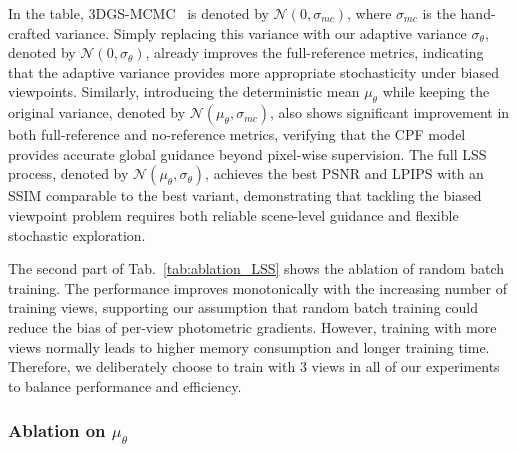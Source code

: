 \documentclass[lettersize,journal]{IEEEtran}
\begin{document}
In the table, 3DGS-MCMC~\cite{mcmc} is denoted by $\mathcal{N}(0, \sigma_{mc})$, where $\sigma_{mc}$ is the hand-crafted variance.  
Simply replacing this variance with our adaptive variance $\sigma_{\theta}$, denoted by $\mathcal{N}(0, \sigma_{\theta})$, already improves the full-reference metrics, indicating that the adaptive variance provides more appropriate stochasticity under biased viewpoints. Similarly, introducing the deterministic mean $\mu_{\theta}$ while keeping the original variance, denoted by $\mathcal{N}(\mu_{\theta}, \sigma_{mc})$, also shows significant improvement in both full-reference and no-reference metrics, verifying that the CPF model provides accurate global guidance beyond pixel-wise supervision.
The full LSS process, denoted by $\mathcal{N}(\mu_{\theta}, \sigma_{\theta})$, achieves the best PSNR and LPIPS with an SSIM comparable to the best variant, demonstrating that tackling the biased viewpoint problem requires both reliable scene-level guidance and flexible stochastic exploration.

The second part of Tab.~\ref{tab:ablation_LSS} shows the ablation of random batch training. The performance improves monotonically with the increasing number of training views, 
supporting our assumption that random batch training could reduce the bias of per-view photometric gradients.
However, training with more views normally leads to higher memory consumption and longer training time. Therefore, we deliberately choose to train with 3 views in all of our experiments to balance performance and efficiency.

\subsubsection{Ablation on $\mu_{\theta}$}
\end{document}
